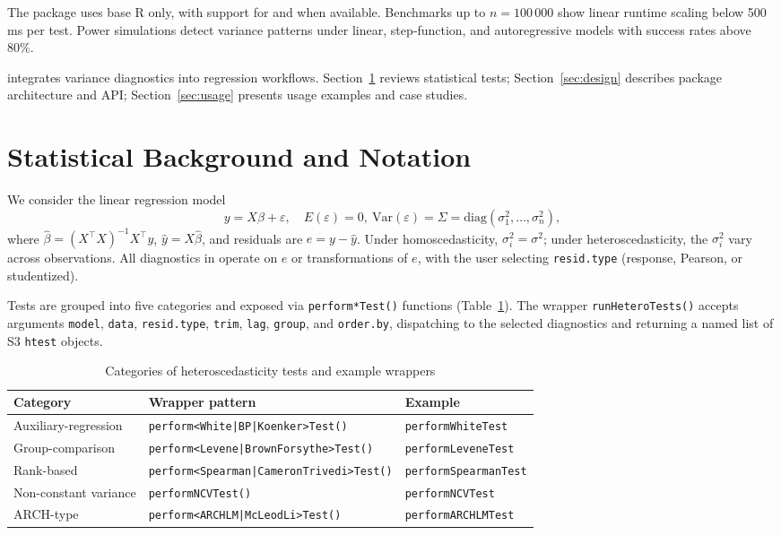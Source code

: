 The package uses base R only, with support for  and  when available. Benchmarks up to \(n=100\,000\) show linear runtime scaling below 500\,ms per test. Power simulations detect variance patterns under linear, step‐function, and autoregressive models with success rates above 80\%.

 integrates variance diagnostics into regression workflows. Section~\ref{sec:background} reviews statistical tests; Section~\ref{sec:design} describes package architecture and API; Section~\ref{sec:usage} presents usage examples and case studies.

\section{Statistical Background and Notation}\label{sec:background}

We consider the linear regression model
\[
  y = X\beta + \varepsilon,\quad E(\varepsilon)=0,\ \mathrm{Var}(\varepsilon)=\Sigma=\mathrm{diag}(\sigma_1^2,\ldots,\sigma_n^2),
\]
where $\hat\beta=(X^\top X)^{-1}X^\top y$, $\hat y = X\hat\beta$, and residuals are $e = y - \hat y$. Under homoscedasticity, $\sigma_i^2=\sigma^2$; under heteroscedasticity, the $\sigma_i^2$ vary across observations. All diagnostics in  operate on $e$ or transformations of $e$, with the user selecting \texttt{resid.type} (response, Pearson, or studentized).

Tests are grouped into five categories and exposed via \texttt{perform*Test()} functions (Table~\ref{tab:test-categories}). The wrapper \texttt{runHeteroTests()} accepts arguments
\texttt{model}, \texttt{data}, \texttt{resid.type}, \texttt{trim}, \texttt{lag}, \texttt{group}, and \texttt{order.by}, dispatching to the selected diagnostics and returning a named list of S3 \texttt{htest} objects.

\begin{table}[ht]
\centering
\caption{Categories of heteroscedasticity tests and example wrappers}
\label{tab:test-categories}
\begin{tabular}{lll}
\toprule
Category & Wrapper pattern & Example \\
\midrule
Auxiliary-regression    & \texttt{perform<White|BP|Koenker>Test()}    & \texttt{performWhiteTest} \\
Group-comparison        & \texttt{perform<Levene|BrownForsythe>Test()} & \texttt{performLeveneTest} \\
Rank-based              & \texttt{perform<Spearman|CameronTrivedi>Test()} & \texttt{performSpearmanTest} \\
Non-constant variance   & \texttt{performNCVTest()}                    & \texttt{performNCVTest} \\
ARCH-type               & \texttt{perform<ARCHLM|McLeodLi>Test()}      & \texttt{performARCHLMTest} \\
\bottomrule
\end{tabular}
\end{table}

